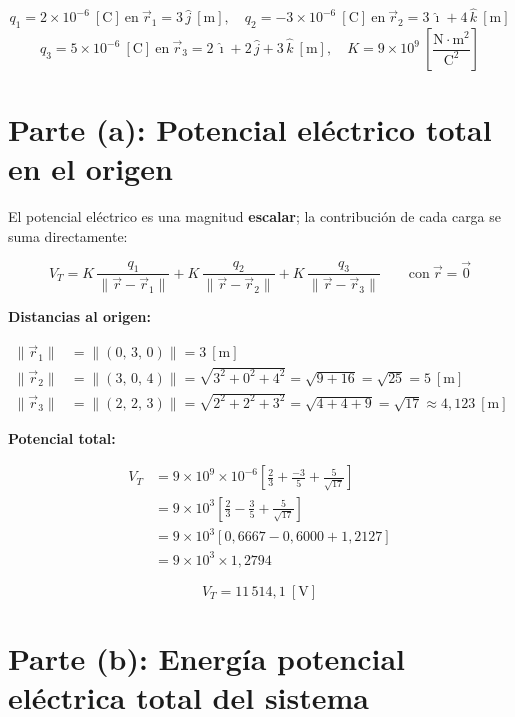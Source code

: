 \documentclass[12pt,letterpaper]{article}
\begin{document}
\[
    q_1 = 2\times10^{-6}\ [\text{C}]\ \text{en}\ \vec{r}_1 = 3\,\hat{j}\ [\text{m}],\quad
    q_2 = -3\times10^{-6}\ [\text{C}]\ \text{en}\ \vec{r}_2 = 3\,\hat{\imath}+4\,\hat{k}\ [\text{m}]
\]
\[
    q_3 = 5\times10^{-6}\ [\text{C}]\ \text{en}\ \vec{r}_3 = 2\,\hat{\imath}+2\,\hat{j}+3\,\hat{k}\ [\text{m}],\quad
    K = 9\times10^{9}\ \left[\frac{\text{N}\cdot\text{m}^2}{\text{C}^2}\right]
\]

\section*{Parte (a): Potencial el\'ectrico total en el origen}

El potencial el\'ectrico es una magnitud \textbf{escalar}; la contribuci\'on de cada carga se suma directamente:

\[
    V_T = K\,\frac{q_1}{\|\vec{r}-\vec{r}_1\|} + K\,\frac{q_2}{\|\vec{r}-\vec{r}_2\|} + K\,\frac{q_3}{\|\vec{r}-\vec{r}_3\|}
    \qquad \text{con}\ \vec{r} = \vec{0}
\]

\noindent\textbf{Distancias al origen:}

\begin{align*}
    \|\vec{r}_1\| &= \|(0,\,3,\,0)\| = 3\ [\text{m}]\\[4pt]
    \|\vec{r}_2\| &= \|(3,\,0,\,4)\| = \sqrt{3^2+0^2+4^2} = \sqrt{9+16} = \sqrt{25} = 5\ [\text{m}]\\[4pt]
    \|\vec{r}_3\| &= \|(2,\,2,\,3)\| = \sqrt{2^2+2^2+3^2} = \sqrt{4+4+9} = \sqrt{17} \approx 4{,}123\ [\text{m}]
\end{align*}

\noindent\textbf{Potencial total:}

\begin{align*}
    V_T &= 9\times10^{9} \times 10^{-6}\left[\frac{2}{3} + \frac{-3}{5} + \frac{5}{\sqrt{17}}\right]\\[6pt]
        &= 9\times10^{3}\left[\frac{2}{3} - \frac{3}{5} + \frac{5}{\sqrt{17}}\right]\\[6pt]
        &= 9\times10^{3}\left[0{,}6667 - 0{,}6000 + 1{,}2127\right]\\[6pt]
        &= 9\times10^{3} \times 1{,}2794
\end{align*}

\[
    \boxed{V_T = 11\,514{,}1\ [\text{V}]}
\]

\section*{Parte (b): Energ\'ia potencial el\'ectrica total del sistema}
\end{document}

